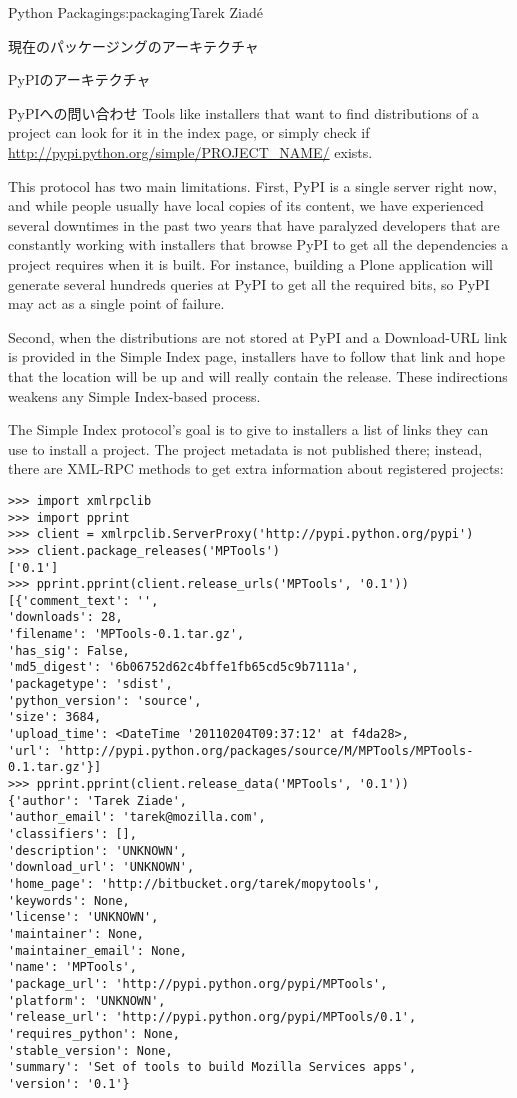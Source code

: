 \begin{aosachapter}{Python Packaging}{s:packaging}{Tarek Ziad\'{e}}
\begin{aosasect1}{現在のパッケージングのアーキテクチャ}
\begin{aosasect2}{PyPIのアーキテクチャ}
\begin{aosasect3}{PyPIへの問い合わせ}
\noindent
Tools like installers that want to find distributions of a project can
look for it in the index page, or simply check if
\url{http://pypi.python.org/simple/PROJECT_NAME/} exists.

This protocol has two main limitations.  First, PyPI is a single
server right now, and while people usually have local copies of its
content, we have experienced several downtimes in the past two years
that have paralyzed developers that are constantly working with
installers that browse PyPI to get all the dependencies a project
requires when it is built. For instance, building a Plone application
will generate several hundreds queries at PyPI to get all the required
bits, so PyPI may act as a single point of failure.

Second, when the distributions are not stored at PyPI and a
Download-URL link is provided in the Simple Index page, installers
have to follow that link and hope that the location will be up and
will really contain the release. These indirections weakens any Simple
Index-based process.

The Simple Index protocol's goal is to give to installers a list of
links they can use to install a project. The project metadata is not
published there; instead, there are XML-RPC methods to get extra
information about registered projects:

\begin{verbatim}
>>> import xmlrpclib
>>> import pprint
>>> client = xmlrpclib.ServerProxy('http://pypi.python.org/pypi')
>>> client.package_releases('MPTools')
['0.1']
>>> pprint.pprint(client.release_urls('MPTools', '0.1'))
[{'comment_text': '',
'downloads': 28,
'filename': 'MPTools-0.1.tar.gz',
'has_sig': False,
'md5_digest': '6b06752d62c4bffe1fb65cd5c9b7111a',
'packagetype': 'sdist',
'python_version': 'source',
'size': 3684,
'upload_time': <DateTime '20110204T09:37:12' at f4da28>,
'url': 'http://pypi.python.org/packages/source/M/MPTools/MPTools-0.1.tar.gz'}]
>>> pprint.pprint(client.release_data('MPTools', '0.1'))
{'author': 'Tarek Ziade',
'author_email': 'tarek@mozilla.com',
'classifiers': [],
'description': 'UNKNOWN',
'download_url': 'UNKNOWN',
'home_page': 'http://bitbucket.org/tarek/mopytools',
'keywords': None,
'license': 'UNKNOWN',
'maintainer': None,
'maintainer_email': None,
'name': 'MPTools',
'package_url': 'http://pypi.python.org/pypi/MPTools',
'platform': 'UNKNOWN',
'release_url': 'http://pypi.python.org/pypi/MPTools/0.1',
'requires_python': None,
'stable_version': None,
'summary': 'Set of tools to build Mozilla Services apps',
'version': '0.1'}
\end{verbatim}


\end{aosasect3}
\end{aosasect2}
\end{aosasect1}
\end{aosachapter}
